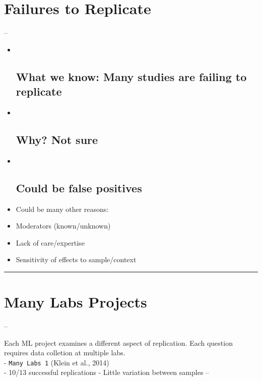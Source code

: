 \documentclass[]{article}
\begin{document}
\section{Failures to Replicate}\label{failures-to-replicate-1}

--

\begin{itemize}
\item ~
  \subsection{What we know: Many studies are failing to
  replicate}\label{what-we-know-many-studies-are-failing-to-replicate}
\item ~
  \subsection{Why? Not sure}\label{why-not-sure}
\item ~
  \subsection{Could be false positives}\label{could-be-false-positives}
\item
  Could be many other reasons:
\item
  Moderators (known/unknown)
\item
  Lack of care/expertise
\item
  Sensitivity of effects to sample/context
\end{itemize}

\begin{center}\rule{0.5\linewidth}{\linethickness}\end{center}

\section{Many Labs Projects}\label{many-labs-projects}

--

Each ML project examines a different aspect of replication. Each
question requires data colletion at multiple labs.\\
- \texttt{Many\ Labs\ 1} (Klein et al., 2014)\\
- 10/13 successful replications - Little variation between samples --
\end{document}
